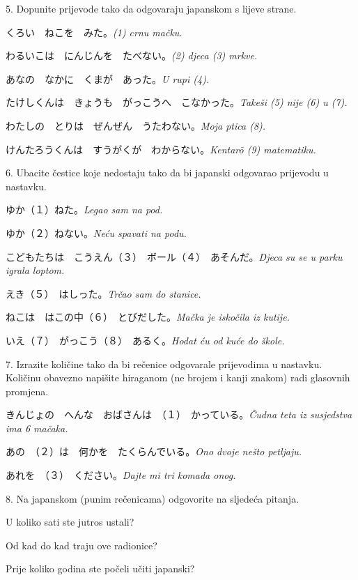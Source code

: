 	\begin{mondai}{5. Dopunite prijevode tako da odgovaraju japanskom s lijeve strane.}
		\item くろい　ねこを　みた。\textit{(1) crnu mačku.}
		\item わるいこは　にんじんを　たべない。\textit{(2) djeca (3) mrkve.}
		\item あなの　なかに　くまが　あった。\textit{U rupi (4).}
		\item たけしくんは　きょうも　がっこうへ　こなかった。\textit{Takeši (5) nije (6) u (7).}
		\item わたしの　とりは　ぜんぜん　うたわない。\textit{Moja ptica (8).}
		\item けんたろうくんは　すうがくが　わからない。\textit{Kentar\={o} (9) matematiku.}
	\end{mondai}
	
	\newpage
	\begin{mondai}{6. Ubacite čestice koje nedostaju tako da bi japanski odgovarao prijevodu u nastavku.}
		\item ゆか（１）ねた。\textit{Legao sam na pod.}
		\item ゆか（２）ねない。\textit{Neću spavati na podu.}
		\item こどもたちは　こうえん（３）　ボール（４）　あそんだ。\textit{Djeca su se u parku igrala loptom.}
		\item えき（５）　はしった。\textit{Trčao sam do stanice.}
		\item ねこは　はこの中（６）　とびだした。\textit{Mačka je iskočila iz kutije.}
		\item いえ（７）　がっこう（８）　あるく。\textit{Hodat ću od kuće do škole.}
	\end{mondai}

	\begin{mondai}{7. Izrazite količine tako da bi rečenice odgovarale prijevodima u nastavku. Količinu obavezno napišite hiraganom (ne brojem i kanji znakom) radi glasovnih promjena.}
		\item きんじょの　へんな　おばさんは　（１）　かっている。\textit{Čudna teta iz susjedstva ima 6 mačaka.}
		\item あの　（２）は　何かを　たくらんでいる。\textit{Ono dvoje nešto petljaju.}
		\item あれを　（３）　ください。\textit{Dajte mi tri komada onog.}
	\end{mondai}

	\begin{mondai}{8. Na japanskom (punim rečenicama) odgovorite na sljedeća pitanja.}
		\item U koliko sati ste jutros ustali?
		\item Od kad do kad traju ove radionice?
		\item Prije koliko godina ste počeli učiti japanski?
	\end{mondai}

